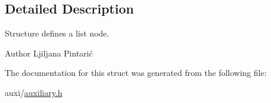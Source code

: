 \subsection{Detailed Description}
Structure defines a list node. 

\begin{DoxyAuthor}{Author}
Ljiljana Pintarić 
\end{DoxyAuthor}


The documentation for this struct was generated from the following file\+:\begin{DoxyCompactItemize}
\item 
auxi/\hyperlink{auxiliary_8h}{auxiliary.\+h}\end{DoxyCompactItemize}
